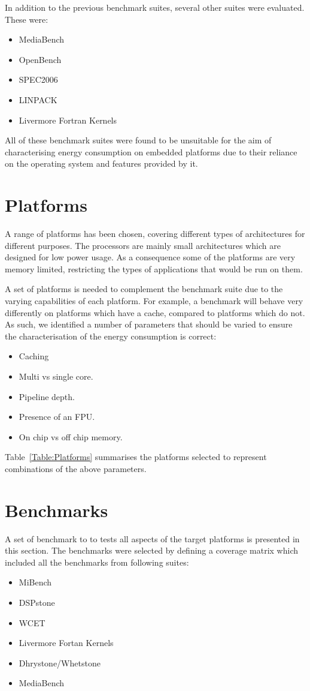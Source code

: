 \documentclass[twocolumn]{article}
\newcommand{\nsection}[1]{\section{\bfseries #1}}
\begin{document}
In addition to the previous benchmark suites, several other suites were evaluated. These were:
\begin{itemize}
	\setlength{\itemsep}{-0.25em}
	\item MediaBench
	\item OpenBench\cite{OpenBench}
	\item SPEC2006\cite{Henning2006}
	\item LINPACK
	\item Livermore Fortran Kernels
\end{itemize}

All of these benchmark suites were found to be unsuitable for the aim of characterising energy consumption on embedded platforms due to their reliance on the operating system and features provided by it.

\nsection{Platforms}

A range of platforms has been chosen, covering different types of architectures for different purposes. The processors are mainly small architectures which are designed for low power usage. As a consequence some of the platforms are very memory limited, restricting the types of applications that would be run on them.

A set of platforms is needed to complement the benchmark suite due to the varying capabilities of each platform. For example, a benchmark will behave very differently on platforms which have a cache, compared to platforms which do not. As such, we identified a number of parameters that should be varied to ensure the characterisation of the energy consumption is correct:

\begin{itemize}
	\setlength{\itemsep}{-0.25em}
	\item Caching
	\item Multi vs single core.
	\item Pipeline depth.
	\item Presence of an FPU.
	\item On chip vs off chip memory.
\end{itemize}

Table~\ref{Table:Platforms} summarises the platforms selected to represent combinations of the above parameters.

\nsection{Benchmarks}

A set of benchmark to to tests all aspects of the target platforms is presented in this section. The benchmarks were selected by defining a coverage matrix which included all the benchmarks from following suites:
\begin{itemize}
	\setlength{\itemsep}{-0.35em}
	\item MiBench
	\item DSPstone
	\item WCET
	\item Livermore Fortan Kernels
	\item Dhrystone/Whetstone
	\item MediaBench
\end{itemize}
\end{document}
